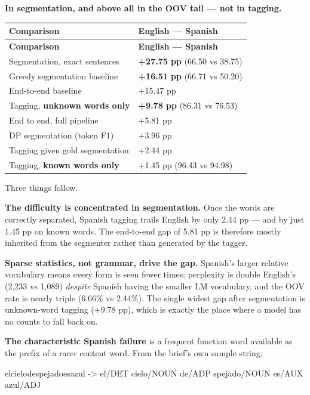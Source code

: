 \documentclass[11pt,a4paper]{article}
\begin{document}
\textbf{In segmentation, and above all in the OOV tail --- not in tagging.}

{\small
\setlength{\tabcolsep}{4pt}
\begin{longtable}{ll}
\toprule
\textbf{Comparison} & \textbf{English --- Spanish} \\
\midrule
\endfirsthead
\toprule
\textbf{Comparison} & \textbf{English --- Spanish} \\
\midrule
\endhead
Segmentation, exact sentences & \textbf{+27.75 pp} (66.50 vs 38.75) \\
Greedy segmentation baseline & \textbf{+16.51 pp} (66.71 vs 50.20) \\
End-to-end baseline & +15.47 pp \\
Tagging, \textbf{unknown words only} & \textbf{+9.78 pp} (86.31 vs 76.53) \\
End to end, full pipeline & +5.81 pp \\
DP segmentation (token F1) & +3.96 pp \\
Tagging given gold segmentation & +2.44 pp \\
Tagging, \textbf{known words only} & +1.45 pp (96.43 vs 94.98) \\
\bottomrule
\end{longtable}}

Three things follow.

\textbf{The difficulty is concentrated in segmentation.} Once the words are correctly separated, Spanish tagging trails English by only 2.44 pp --- and by just 1.45 pp on known words. The end-to-end gap of 5.81 pp is therefore mostly inherited from the segmenter rather than generated by the tagger.

\textbf{Sparse statistics, not grammar, drive the gap.} Spanish's larger relative vocabulary means every form is seen fewer times: perplexity is double English's (2,233 vs 1,089) \textit{despite} Spanish having the smaller LM vocabulary, and the OOV rate is nearly triple (6.66\% vs 2.44\%). The single widest gap after segmentation is unknown-word tagging (+9.78 pp), which is exactly the place where a model has no counts to fall back on.

\textbf{The characteristic Spanish failure} is a frequent function word available as the prefix of a rarer content word. From the brief's own sample string:

\begin{codeblock}
elcielodespejadoesazul
-> el/DET cielo/NOUN de/ADP spejado/NOUN es/AUX azul/ADJ
\end{codeblock}
\end{document}
